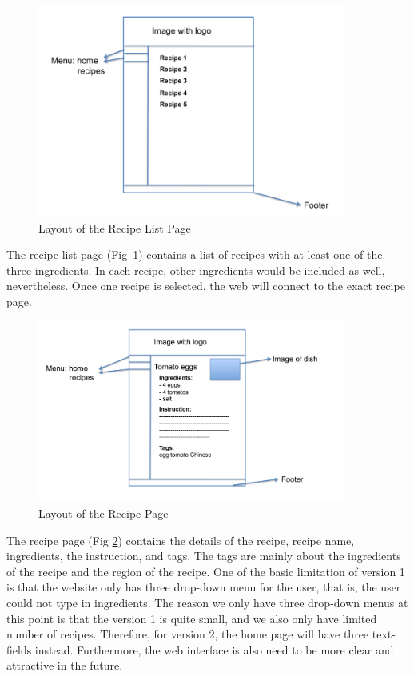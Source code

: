 \begin{figure}
\includegraphics[width=0.9\textwidth]{recipe_list_page}
\caption{Layout of the Recipe List Page}
\label{fig:recipe_list}
\end{figure}

The recipe list page (Fig~\ref{fig:recipe_list}) contains a list of recipes with at least one of the three ingredients. In each recipe, other ingredients would be included as well, nevertheless. Once one recipe is selected, the web will connect to the exact recipe page.

\begin{figure}
\includegraphics[width=0.9\textwidth]{recipe_page}
\caption{Layout of the Recipe Page}
\label{fig:recipe_page}
\end{figure}

The recipe page (Fig \ref{fig:recipe_page}) contains the details of the recipe, recipe name, ingredients, the instruction, and tags. The tags are mainly about the ingredients of the recipe and the region of the recipe.
One of the basic limitation of version 1 is that the website only has three drop-down menu for the user, that is, the user could not type in ingredients. The reason we only have three drop-down menus at this point is that the version 1 is quite small, and we also only have limited number of recipes. Therefore, for version 2, the home page will have three text-fields instead. Furthermore, the web interface is also need to be more clear and attractive in the future.

